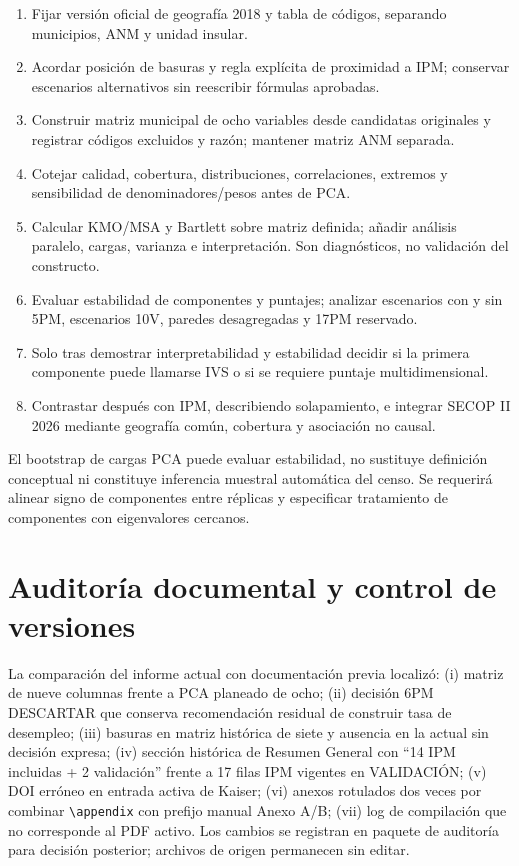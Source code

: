 \documentclass[11pt,a4paper]{article}
\begin{document}
\begin{enumerate}[leftmargin=1.2cm]
\item Fijar versión oficial de geografía 2018 y tabla de códigos, separando municipios, ANM y unidad insular.
\item Acordar posición de basuras y regla explícita de proximidad a IPM; conservar escenarios alternativos sin reescribir fórmulas aprobadas.
\item Construir matriz municipal de ocho variables desde candidatas originales y registrar códigos excluidos y razón; mantener matriz ANM separada.
\item Cotejar calidad, cobertura, distribuciones, correlaciones, extremos y sensibilidad de denominadores/pesos antes de PCA.
\item Calcular KMO/MSA y Bartlett sobre matriz definida; añadir análisis paralelo, cargas, varianza e interpretación. Son diagnósticos, no validación del constructo.
\item Evaluar estabilidad de componentes y puntajes; analizar escenarios con y sin 5PM, escenarios 10V, paredes desagregadas y 17PM reservado.
\item Solo tras demostrar interpretabilidad y estabilidad decidir si la primera componente puede llamarse IVS o si se requiere puntaje multidimensional.
\item Contrastar después con IPM, describiendo solapamiento, e integrar SECOP II 2026 mediante geografía común, cobertura y asociación no causal.
\end{enumerate}

El bootstrap de cargas PCA puede evaluar estabilidad, no sustituye definición conceptual ni constituye inferencia muestral automática del censo. Se requerirá alinear signo de componentes entre réplicas y especificar tratamiento de componentes con eigenvalores cercanos.

\section{Auditoría documental y control de versiones}

La comparación del informe actual con documentación previa localizó: (i) matriz de nueve columnas frente a PCA planeado de ocho; (ii) decisión 6PM DESCARTAR que conserva recomendación residual de construir tasa de desempleo; (iii) basuras en matriz histórica de siete y ausencia en la actual sin decisión expresa; (iv) sección histórica de Resumen General con “14 IPM incluidas + 2 validación” frente a 17 filas IPM vigentes en VALIDACIÓN; (v) DOI erróneo en entrada activa de Kaiser; (vi) anexos rotulados dos veces por combinar \texttt{\textbackslash appendix} con prefijo manual Anexo A/B; (vii) log de compilación que no corresponde al PDF activo. Los cambios se registran en paquete de auditoría para decisión posterior; archivos de origen permanecen sin editar.
\end{document}
